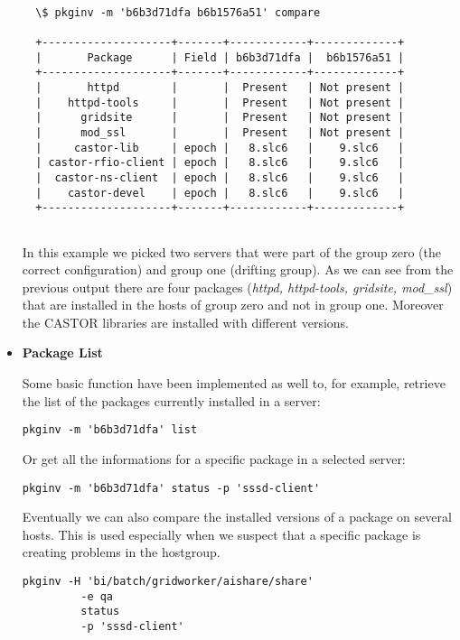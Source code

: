 \begin{itemize}
  \begin{lstlisting}[frame=single]
  
  \$ pkginv -m 'b6b3d71dfa b6b1576a51' compare

  +--------------------+-------+------------+-------------+
  |       Package      | Field | b6b3d71dfa |  b6b1576a51 |
  +--------------------+-------+------------+-------------+
  |       httpd        |       |  Present   | Not present |
  |    httpd-tools     |       |  Present   | Not present |
  |      gridsite      |       |  Present   | Not present |
  |      mod_ssl       |       |  Present   | Not present |
  |     castor-lib     | epoch |   8.slc6   |    9.slc6   |
  | castor-rfio-client | epoch |   8.slc6   |    9.slc6   |
  |  castor-ns-client  | epoch |   8.slc6   |    9.slc6   |
  |    castor-devel    | epoch |   8.slc6   |    9.slc6   |
  +--------------------+-------+------------+-------------+
  
  \end{lstlisting}

  In this example we picked two servers that were part of the group zero
  (the correct configuration) and group one (drifting group). As we can
  see from the previous output there are four packages (\textit{httpd,
  httpd-tools, gridsite, mod\_ssl}) that are installed in the hosts of
  group zero and not in group one. Moreover the CASTOR \cite{castor}
  libraries are installed with different versions.

  \item \textbf{Package List}

  Some basic function have been implemented as well to, for example,
  retrieve the list of the packages currently installed in a server:

  \begin{lstlisting}[frame=single]
  pkginv -m 'b6b3d71dfa' list
  \end{lstlisting}
  
  Or get all the informations for a specific package in a selected
  server:
  
  \begin{lstlisting}[frame=single]
  pkginv -m 'b6b3d71dfa' status -p 'sssd-client'
  \end{lstlisting}
 
  Eventually we can also compare the installed versions of a package on
  several hosts. This is used especially when we suspect that a specific
  package is creating problems in the hostgroup.
  
  \begin{lstlisting}[frame=single]
  pkginv -H 'bi/batch/gridworker/aishare/share'
         -e qa
         status
         -p 'sssd-client'
  \end{lstlisting}


\end{itemize}
